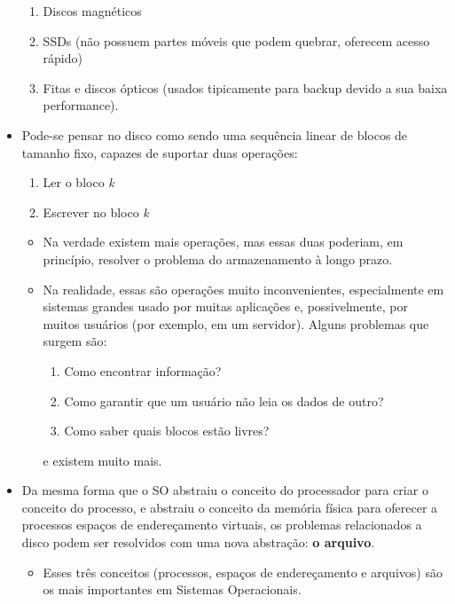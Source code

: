 \documentclass[10pt]{article}
\begin{document}
\begin{itemize}
    \begin{enumerate}
        \item Discos magnéticos
        \item SSDs (não possuem partes móveis que podem quebrar, oferecem acesso rápido)
        \item Fitas e discos ópticos (usados tipicamente para backup devido a sua baixa
        performance).
    \end{enumerate}
    \item Pode-se pensar no disco como sendo uma sequência linear de blocos de tamanho
    fixo, capazes de suportar duas operações:
    \begin{enumerate}
        \item Ler o bloco \textit{k}
        \item Escrever no bloco \textit{k}
    \end{enumerate}
    \begin{itemize}
        \item Na verdade existem mais operações, mas essas duas poderiam, em princípio,
        resolver o problema do armazenamento à longo prazo.
        \item Na realidade, essas são operações muito inconvenientes, especialmente
        em sistemas grandes usado por muitas aplicações e, possivelmente, por muitos
        usuários (por exemplo, em um servidor). Alguns problemas que surgem são:
        \begin{enumerate}
            \item Como encontrar informação?
            \item Como garantir que um usuário não leia os dados de outro?
            \item Como saber quais blocos estão livres?
        \end{enumerate}
        e existem muito mais.
    \end{itemize}
    \item Da mesma forma que o SO abstraiu o conceito do processador para criar o 
    conceito do processo, e abstraiu o conceito da memória física para oferecer
    a processos espaços de endereçamento virtuais, os problemas relacionados a disco
    podem ser resolvidos com uma nova abstração: \textbf{o arquivo}. 
    \begin{itemize}
        \item Esses três conceitos (processos, espaços de endereçamento e arquivos)
        são os mais importantes em Sistemas Operacionais.
    \end{itemize}

\end{itemize}
\end{document}
